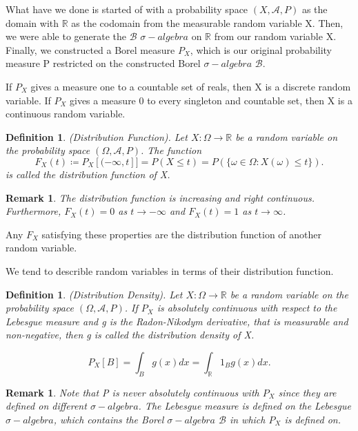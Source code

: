 \documentclass[twoside]{article}
\newtheorem{remark}[theorem]{Remark}
\newtheorem{definition}[theorem]{Definition}
\newcommand{\sa}{\sigma-algebra}
\begin{document}
What have we done is started of with a probability space $(X, \mathcal{A}, P)$ as the domain with $\mathbb{R}$ as the codomain from the measurable random variable X. Then, we were able to generate the $\mathcal{B}$ $\sa$ on $\mathbb{R}$ from our random variable X. Finally, we constructed a Borel measure $P_X$, which is our original probability measure P restricted on the constructed Borel $\sa$ $\mathcal{B}$.

If $P_X$ gives a measure one to a countable set of reals, then X is a discrete random variable. If $P_X$ gives a measure 0 to every singleton and countable set, then X is a continuous random variable.

\begin{definition}(Distribution Function). Let $X: \Omega \rightarrow \mathbb{R}$ be a random variable on the probability space $(\Omega, \mathcal{A}, P)$. The function
$$
F_X(t) \coloneqq P_X[(-\infty,t]] = P(X \leq t) = P(\{\omega \in \Omega: X(\omega) \leq t\}).
$$
is called the distribution function of X.
\end{definition}

\begin{remark} The distribution function is increasing and right continuous. Furthermore, $F_X(t) = 0$ as $t \rightarrow -\infty$ and $F_X(t) = 1$ as $t \rightarrow \infty$.
\end{remark}

Any $F_X$ satisfying these properties are the distribution function of another random variable.

We tend to describle random variables in terms of their distribution function. 

\begin{definition}(Distribution Density). Let $X: \Omega \rightarrow \mathbb{R}$ be a random variable on the probability space $(\Omega, \mathcal{A}, P)$. If $P_X$ is absolutely continuous with respect to the Lebesgue measure and g is the Radon-Nikodym derivative, that is measurable and non-negative, then g is called the distribution density of X. 

$$
P_X[B] = \int_Bg(x)dx = \int_{\mathbb{R}}1_Bg(x)dx.
$$

\end{definition}

\begin{remark}
Note that P is never absolutely continuous with $P_X$ since they are defined on different $\sa$. The Lebesgue measure is defined on the Lebesgue $\sa$, which contains the Borel $\sa$ $\mathcal{B}$ in which $P_X$ is defined on.
\end{remark}
\end{document}
